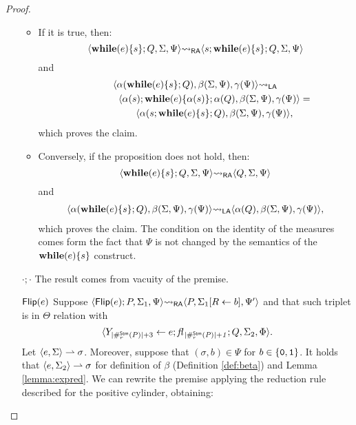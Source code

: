 \begin{proof}
\begin{itemize}
    \begin{itemize}
      \item If it is true, then:
          $$
          \langle \mathbf{while}(e)\{s\}; Q, \Sigma, \Psi\rangle {\leadsto_{\mathsf{RA}}} \langle s;\mathbf{while}(e)\{s\}; Q, \Sigma, \Psi\rangle
          $$
          and
          $$
          \begin{gathered}
          \langle \alpha(\mathbf{while}(e)\{s\}; Q), \beta(\Sigma, \Psi), \gamma(\Psi)\rangle {\leadsto_{\mathsf{LA}}}\\\quad\quad\quad\quad \langle\alpha(s); \mathbf{while}(e)\{\alpha(s)\}; \alpha(Q), \beta(\Sigma, \Psi), \gamma(\Psi)\rangle =
          \\\quad\quad\quad\quad\langle\alpha(s;\mathbf{while}(e)\{s\}; Q), \beta(\Sigma, \Psi), \gamma(\Psi)\rangle,
          \end{gathered}
          $$
          which proves the claim.
      \item Conversely, if the proposition does not hold, then:
          $$
          \langle \mathbf{while}(e)\{s\};Q, \Sigma, \Psi\rangle {\leadsto_{\mathsf{RA}}} \langle Q, \Sigma, \Psi\rangle
          $$
          and
          $$
          \begin{gathered}
          \langle \alpha(\while e s; Q), \beta(\store, \Psi), \gamma(\Psi)\rangle \leadstola%
           \langle\alpha(Q), \beta(\store, \Psi), \gamma(\Psi)\rangle,
          \end{gathered}
          $$
          which proves the claim. The condition on the identity of the measures
          comes form the fact that $\Psi$ is not changed by the semantics
          of the $\mathbf{while}(e)\{s\}$ construct.
    \end{itemize}
    \item[$\cdot;\cdot$] The result comes from vacuity of the premise.
    \item[$\mathsf{Flip(}e\mathsf{)}$]
    Suppose $\langle \mathsf{Flip(}e\mathsf{)}; P, \Sigma_1, \Psi\rangle {\leadsto_{\mathsf{RA}}} \langle P, \Sigma_1 [R \leftarrow b], \Psi'\rangle$
    and that such triplet is in $\Theta$ relation with
    $$
    \langle Y_{|\#_r^{\mathsf{Stm}}(P)|+3}\leftarrow e; \mathit{fl_{\,|\#_r^{\mathsf{Stm}}(P)|+1}}; Q, \Sigma_2, \Phi\rangle.
    $$
    Let $\langle e, \Sigma\rangle \rightharpoonup \sigma$. Moreover, suppose that
    $(\sigma, b) \in \Psi$ for $b \in \{\mathtt{0}, \mathtt{1}\}$.
%
    It holds that $\langle e, \Sigma_2\rangle \rightharpoonup \sigma$ for definition of $\beta$ (Definition \ref{def:beta}) and
     Lemma \ref{lemma:expred}. We can rewrite the premise applying
    the reduction rule described for the positive cylinder, obtaining:

\end{itemize}
\end{proof}
